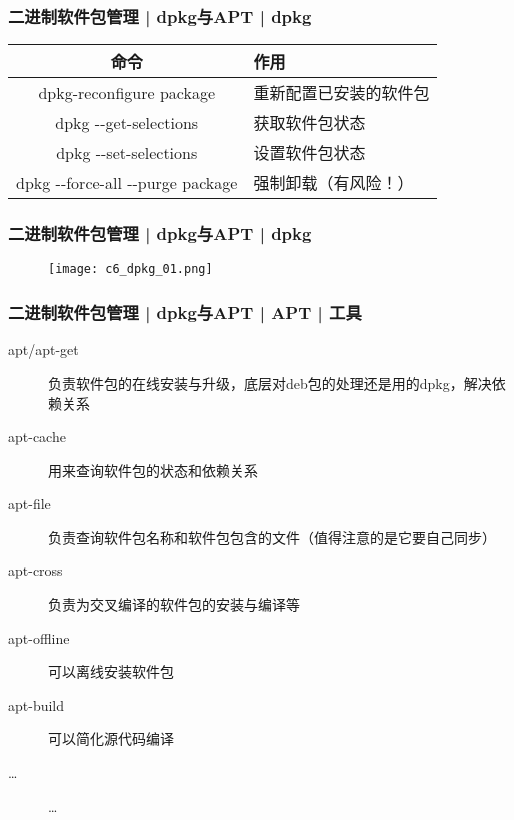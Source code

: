 \begin{frame}[fragile]
  \frametitle{二进制软件包管理 | dpkg与APT | dpkg}
  \begin{table}
    \centering
    \begin{tabularx}{\textwidth}{cX}
      \hline
      \rowcolor{blue!50}命令 & 作用\\
      \hline
      dpkg-reconfigure package & 重新配置已安装的软件包\\
      dpkg -\!-get-selections & 获取软件包状态\\
      dpkg -\!-set-selections & 设置软件包状态\\
      dpkg -\!-force-all -\!-purge package & 强制卸载（有风险！）\\
      \hline
    \end{tabularx}
  \end{table}
\end{frame}

\begin{frame}
  \frametitle{二进制软件包管理 | dpkg与APT | dpkg}
  \begin{figure}
    \centering
    \texttt{[image: c6\_dpkg\_01.png]}
  \end{figure}
\end{frame}

\begin{frame}
  \frametitle{二进制软件包管理 | dpkg与APT | APT | 工具}
  \begin{description}
    \item[apt/apt-get] 负责软件包的在线安装与升级，底层对deb包的处理还是用的dpkg，解决依赖关系
    \item[apt-cache] 用来查询软件包的状态和依赖关系
    \item[apt-file] 负责查询软件包名称和软件包包含的文件（值得注意的是它要自己同步）
    \item[apt-cross] 负责为交叉编译的软件包的安装与编译等
    \item[apt-offline] 可以离线安装软件包
    \item[apt-build] 可以简化源代码编译
    \item[\ldots] \ldots
  \end{description}
\end{frame}

